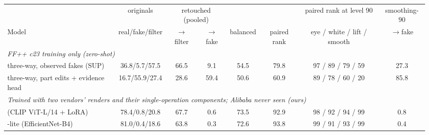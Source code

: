 \begin{tabular}{l c cc c c c c}
\toprule
 & originals & \multicolumn{2}{c}{retouched (pooled)} & & & paired rank at level 90 & smoothing-90 \\
\cmidrule(lr){3-4}
Model & real/fake/filter & $\to$filter & $\to$fake & balanced & paired rank & eye / white / lift / smooth & $\to$fake \\
\midrule
\multicolumn{8}{l}{\textit{FF++ c23 training only (zero-shot)}} \\
three-way, observed fakes (SUP) & 36.8/5.7/57.5 & 66.5 & 9.1 & 54.5 & 79.8 & 97 / 89 / 79 / 59 & 27.3 \\
three-way, part edits + evidence head & 16.7/55.9/27.4 & 28.6 & 59.4 & 50.6 & 60.9 & 89 / 78 / 60 / 20 & 85.8 \\
\midrule
\multicolumn{8}{l}{\textit{Trained with two vendors' renders and their single-operation components; Alibaba never seen (ours)}} \\
\textbf{\ours{}} (CLIP ViT-L/14 + LoRA) & 78.4/0.8/20.8 & 67.7 & 0.6 & 73.5 & 92.9 & 98 / 92 / 94 / 99 & 0.8 \\
\ours{}-lite (EfficientNet-B4) & 81.0/0.4/18.6 & 63.8 & 0.3 & 72.6 & 93.8 & 99 / 91 / 93 / 99 & 0.4 \\
\bottomrule
\end{tabular}
